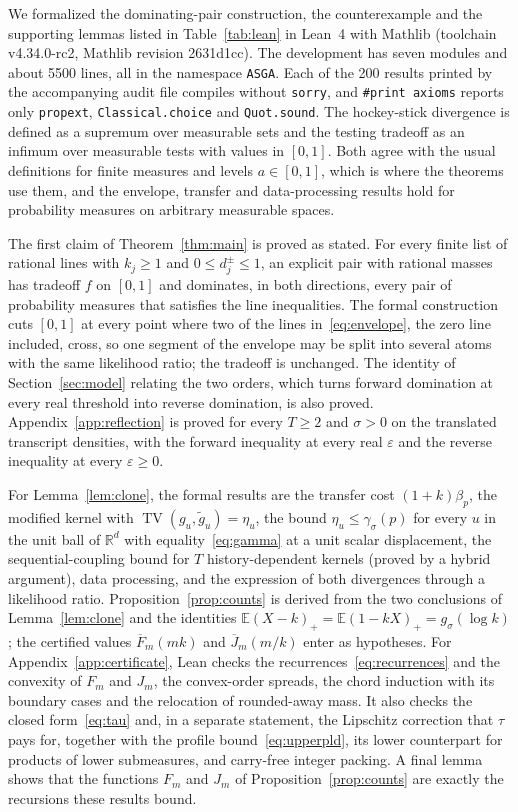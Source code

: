 \documentclass[conference]{IEEEtran}
\newcommand{\E}{\mathbb E}
\newcommand{\R}{\mathbb R}
\newcommand{\TV}{\operatorname{TV}}
\newcommand{\eps}{\varepsilon}
\begin{document}
We formalized the dominating-pair construction, the counterexample and the supporting lemmas listed in Table~\ref{tab:lean} in Lean~4 with Mathlib (toolchain v4.34.0-rc2, Mathlib revision 2631d1cc). The development has seven modules and about 5500 lines, all in the namespace \texttt{ASGA}. Each of the 200 results printed by the accompanying audit file compiles without \texttt{sorry}, and \texttt{\#print axioms} reports only \texttt{propext}, \texttt{Classical.choice} and \texttt{Quot.sound}. The hockey-stick divergence is defined as a supremum over measurable sets and the testing tradeoff as an infimum over measurable tests with values in $[0,1]$. Both agree with the usual definitions for finite measures and levels $a\in[0,1]$, which is where the theorems use them, and the envelope, transfer and data-processing results hold for probability measures on arbitrary measurable spaces.

The first claim of Theorem~\ref{thm:main} is proved as stated. For every finite list of rational lines with $k_j\ge1$ and $0\le d_j^\pm\le1$, an explicit pair with rational masses has tradeoff $f$ on $[0,1]$ and dominates, in both directions, every pair of probability measures that satisfies the line inequalities. The formal construction cuts $[0,1]$ at every point where two of the lines in~\eqref{eq:envelope}, the zero line included, cross, so one segment of the envelope may be split into several atoms with the same likelihood ratio; the tradeoff is unchanged. The identity of Section~\ref{sec:model} relating the two orders, which turns forward domination at every real threshold into reverse domination, is also proved. Appendix~\ref{app:reflection} is proved for every $T\ge2$ and $\sigma>0$ on the translated transcript densities, with the forward inequality at every real $\eps$ and the reverse inequality at every $\eps\ge0$.

For Lemma~\ref{lem:clone}, the formal results are the transfer cost $(1+k)\beta_p$, the modified kernel with $\TV(g_u,\widetilde g_u)=\eta_u$, the bound $\eta_u\le\gamma_\sigma(p)$ for every $u$ in the unit ball of $\R^d$ with equality~\eqref{eq:gamma} at a unit scalar displacement, the sequential-coupling bound for $T$ history-dependent kernels (proved by a hybrid argument), data processing, and the expression of both divergences through a likelihood ratio. Proposition~\ref{prop:counts} is derived from the two conclusions of Lemma~\ref{lem:clone} and the identities $\E(X-k)_+=\E(1-kX)_+=g_\sigma(\log k)$; the certified values $\overline F_m(mk)$ and $\overline J_m(m/k)$ enter as hypotheses. For Appendix~\ref{app:certificate}, Lean checks the recurrences~\eqref{eq:recurrences} and the convexity of $F_m$ and $J_m$, the convex-order spreads, the chord induction with its boundary cases and the relocation of rounded-away mass. It also checks the closed form~\eqref{eq:tau} and, in a separate statement, the Lipschitz correction that $\tau$ pays for, together with the profile bound~\eqref{eq:upperpld}, its lower counterpart for products of lower submeasures, and carry-free integer packing. A final lemma shows that the functions $F_m$ and $J_m$ of Proposition~\ref{prop:counts} are exactly the recursions these results bound.
\end{document}
